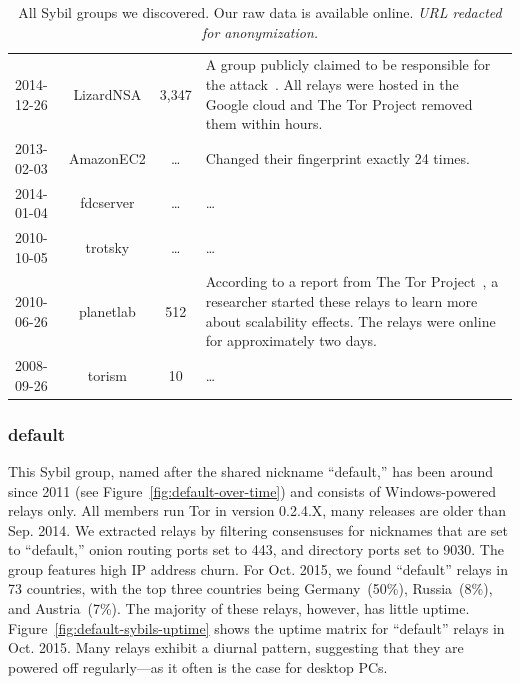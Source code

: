 \begin{table}[t]
\begin{tabular}{l c c p{10cm}}
2014-12-26 & LizardNSA & 3,347 & A group publicly claimed to be responsible for
the attack~\cite{lizards}.  All relays were hosted in the Google cloud and The
Tor Project removed them within hours. \\

2013-02-03 & AmazonEC2 & \ldots & Changed their fingerprint exactly 24 times. \\

2014-01-04 & fdcserver & \ldots & \ldots \\

2010-10-05 & trotsky & \ldots & \ldots \\

2010-06-26 & planetlab & 512 & According to a report from The Tor
Project~\cite{progressreport}, a researcher started these relays to learn more
about scalability effects.  The relays were online for approximately two days. \\

2008-09-26 & torism & 10 & \ldots \\
\end{tabular}
\caption{All Sybil groups we discovered.  Our raw data is available
online. \emph{URL redacted for anonymization.}}
\label{tab:sybils}
\end{table}

\subsubsection{default}
\label{sec:default-sybils}
This Sybil group, named after the shared nickname ``default,'' has been around
since 2011 (see Figure~\ref{fig:default-over-time}) and consists of
Windows-powered relays only.  All members run Tor in version 0.2.4.X, many
releases are older than Sep. 2014.  We extracted relays by filtering consensuses
for nicknames that are set to ``default,'' onion routing ports set to 443, and
directory ports set to 9030.  The group features high IP address churn.  For
Oct. 2015, we found ``default'' relays in 73 countries, with the top three
countries being Germany~(50\%), Russia~(8\%), and Austria~(7\%).  The majority
of these relays, however, has little uptime.
Figure~\ref{fig:default-sybils-uptime} shows the uptime matrix for ``default''
relays in Oct. 2015.  Many relays exhibit a diurnal pattern, suggesting
that they are powered off regularly---as it often is the case for desktop PCs.

